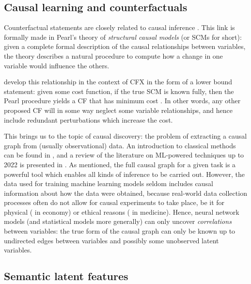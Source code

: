 \documentclass[../main.tex]{subfiles}
\begin{document}
\subsection{Causal learning and counterfactuals}


Counterfactual statements are closely related to causal inference \cite{morganCounterfactuals2015}.
This link is formally made in Pearl's theory of \emph{structural causal models} (or SCMs for short): given a complete formal description of the causal relationships between variables, the theory describes a natural procedure to compute how a change in one variable would influence the others. 

\citeauthor{karimiAlgorithmic2020} develop this relationship in the context of CFX in the form of a lower bound statement: given some cost function, if the true SCM is known fully, then the Pearl procedure yields a CF that has minimum cost \cite{karimiAlgorithmic2020}.
In other words, any other proposed CF will in some way neglect some variable relationships, and hence include redundant perturbations which increase the cost.

This brings us to the topic of causal discovery: the problem of extracting a causal graph from (usually observational) data.
An introduction to classical methods can be found in \cite{cunninghamCausal2021}, and a review of the literature on ML-powered techniques up to 2022 is presented in \cite{vowelsYa2023}.
As mentioned, the full causal graph for a given task is a powerful tool which enables all kinds of inference to be carried out.
However, the data used for training machine learning models seldom includes causal information about how the data were obtained, because real-world data collection processes often do not allow for causal experiments to take place, be it for physical (\eg{} in economy) or ethical reasons (\eg{} in medicine).
Hence, neural network models (and statistical models more generally) can only uncover \emph{correlations} between variables: the true form of the causal graph can only be known up to undirected edges between variables and possibly some unobserved latent variables.

\subsection{Semantic latent features}
\end{document}
